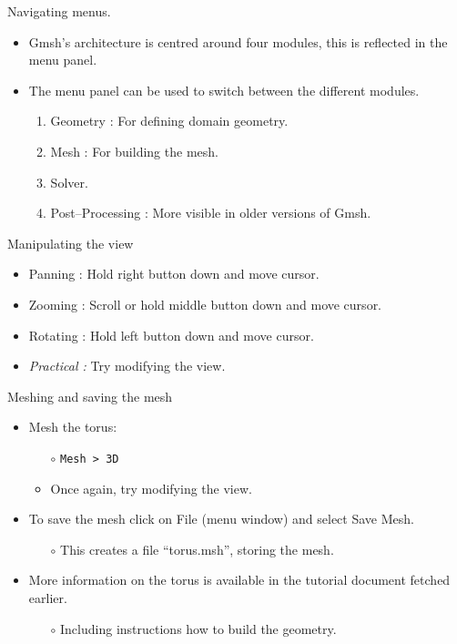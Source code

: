 \documentclass[t]{beamer}
\begin{document}
\begin{frame}{Navigating menus.}
   \begin{itemize}
     \item Gmsh's architecture is centred around four modules, this is reflected in the menu panel.\\[10pt]
     \item The menu panel can be used to switch between the different modules.\\[10pt]
     \begin{enumerate}
       \item Geometry : For defining domain geometry.
       \item Mesh : For building the mesh.
       \item Solver.
       \item Post--Processing : More visible in older versions of Gmsh.
     \end{enumerate}
   \end{itemize}
\end{frame}

\begin{frame}{Manipulating the view}
\begin{itemize}
\item Panning : Hold right button down and move cursor.
\item Zooming : Scroll or hold middle button down and move cursor.
\item Rotating : Hold left button down and move cursor.
\item \emph{Practical :} Try modifying the view.
\end{itemize}
\end{frame}

\begin{frame}{Meshing and saving the mesh}
\begin{itemize}
\item Mesh the torus:
\begin{itemize}
  \item[$\circ$] \lstinline{Mesh > 3D}
  \item[$\circ$] Once again, try modifying the view.
\end{itemize}
\vspace{5pt}
\item To save the mesh click on File (menu window) and select Save Mesh.
\begin{itemize}
  \item[$\circ$] This creates a file ``torus.msh'', storing the mesh.
\end{itemize}
\vspace{5pt}
\item More information on the torus is available in the tutorial document fetched earlier.
\begin{itemize}
  \item[$\circ$] Including instructions how to build the geometry.
\end{itemize}
\end{itemize}
\end{frame}
\end{document}
